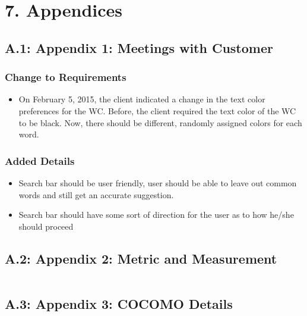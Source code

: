 \documentclass[]{article}
\begin{document}
\section{7. Appendices}\label{appendices}

\subsection{A.1: Appendix 1: Meetings with
Customer}\label{a.1-appendix-1-meetings-with-customer}

\subsubsection{Change to Requirements}\label{change-to-requirements}

\begin{itemize}
\itemsep1pt\parskip0pt
\item
  On February 5, 2015, the client indicated a change in the text color
  preferences for the WC. Before, the client required the text color of
  the WC to be black. Now, there should be different, randomly assigned
  colors for each word.
\end{itemize}

\subsubsection{Added Details}\label{added-details}

\begin{itemize}
\itemsep1pt\parskip0pt
\item
  Search bar should be user friendly, user should be able to leave out
  common words and still get an accurate suggestion.
\item
  Search bar should have some sort of direction for the user as to how
  he/she should proceed
\end{itemize}

\subsection{A.2: Appendix 2: Metric and
Measurement}\label{a.2-appendix-2-metric-and-measurement}

$$
$$


\subsection{A.3: Appendix 3: COCOMO
Details}\label{a.3-appendix-3-cocomo-details}
\end{document}
